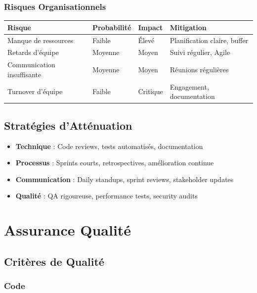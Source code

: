 \documentclass[12pt,a4paper,french]{report}
\begin{document}
\subsection{Risques Organisationnels}

\begin{table}[H]
\centering
\begin{tabularx}{\textwidth}{|l|l|l|l|}
\hline
\rowcolor{LightGray}
\textbf{Risque} & \textbf{Probabilité} & \textbf{Impact} & \textbf{Mitigation} \\
\hline
Manque de ressources & Faible & Élevé & Planification claire, buffer \\
\hline
Retards d'équipe & Moyenne & Moyen & Suivi régulier, Agile \\
\hline
Communication insuffisante & Moyenne & Moyen & Réunions régulières \\
\hline
Turnover d'équipe & Faible & Critique & Engagement, documentation \\
\hline
\end{tabularx}
\end{table}

\section{Stratégies d'Atténuation}

\begin{itemize}
    \item \textbf{Technique} : Code reviews, tests automatisés, documentation
    \item \textbf{Processus} : Sprints courts, retrospectives, amélioration continue
    \item \textbf{Communication} : Daily standups, sprint reviews, stakeholder updates
    \item \textbf{Qualité} : QA rigoureuse, performance tests, security audits
\end{itemize}

\chapter{Assurance Qualité}

\section{Critères de Qualité}

\subsection{Code}
\end{document}
